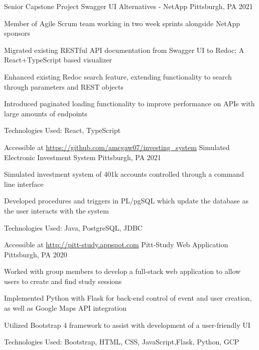 \documentclass[]{awesome-cv}
\begin{document}
\vspace{-11mm}
\begin{cventries}
\cventry
	{Senior Capstone Project }
	{Swagger UI Alternatives - NetApp }
	{Pittsburgh, PA}
	{2021}
	{\begin{cvitems}
	    \item {Member of Agile Scrum team working in two week sprints alongside NetApp sponsors }
		\item {Migrated existing RESTful API documentation from Swagger UI to Redoc; A React+TypeScript based visualizer}
		\item {Enhanced existing Redoc search feature, extending functionality to search through parameters and REST objects}
		\item {Introduced paginated loading functionality to improve performance on APIs with large amounts of endpoints}
		\item {Technologies Used: React, TypeScript}
		\end{cvitems}}
	\cventry
	{Accessible at \href{https://github.com/amcgaw07/investing_system} {https://github.com/amcgaw07/investing\_system}}
	{Simulated Electronic Investment System}
	{Pittsburgh, PA}
	{2021}
	{\begin{cvitems}
		\item {Simulated investment system of 401k accounts controlled through a command line interface}
		\item {Developed procedures and triggers in PL/pgSQL which update the database as the user interacts with the system}
		\item {Technologies Used: Java, PostgreSQL, JDBC}
		\end{cvitems}}
	\cventry	
	{Accessible at \href{http://pitt-study.appspot.com} {http://pitt-study.appspot.com}}
	{Pitt-Study Web Application}
	{Pittsburgh, PA}
	{2020}
	{\begin{cvitems}
		\item {Worked with group members to develop a full-stack web application to allow users to create and find study sessions}
		\item {Implemented Python with Flask for back-end control of event and user creation, as well as Google Maps API integration}
		\item {Utilized Bootstrap 4 framework to assist with development of a user-friendly UI}
		\item {Technologies Used: Bootstrap, HTML, CSS, JavaScript,Flask, Python, GCP}
		\end{cvitems}}

\end{cventries}
\end{document}

